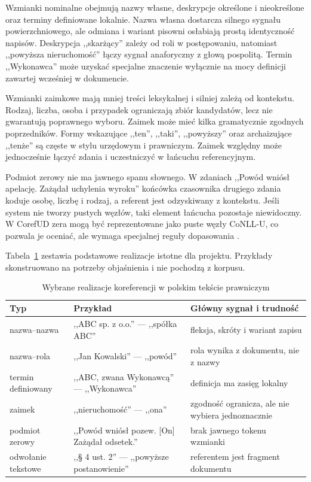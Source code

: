 Wzmianki nominalne obejmują nazwy własne, deskrypcje określone i nieokreślone oraz terminy definiowane lokalnie. Nazwa własna dostarcza silnego sygnału powierzchniowego, ale odmiana i wariant pisowni osłabiają prostą identyczność napisów. Deskrypcja ,,skarżący'' zależy od roli w postępowaniu, natomiast ,,powyższa nieruchomość'' łączy sygnał anaforyczny z głową pospolitą. Termin ,,Wykonawca'' może uzyskać specjalne znaczenie wyłącznie na mocy definicji zawartej wcześniej w dokumencie.

Wzmianki zaimkowe mają mniej treści leksykalnej i silniej zależą od kontekstu. Rodzaj, liczba, osoba i przypadek ograniczają zbiór kandydatów, lecz nie gwarantują poprawnego wyboru. Zaimek może mieć kilka gramatycznie zgodnych poprzedników. Formy wskazujące ,,ten'', ,,taki'', ,,powyższy'' oraz archaizujące ,,tenże'' są częste w stylu urzędowym i prawniczym. Zaimek względny może jednocześnie łączyć zdania i uczestniczyć w łańcuchu referencyjnym.

Podmiot zerowy nie ma jawnego spanu słownego. W zdaniach ,,Powód wniósł apelację. Zażądał uchylenia wyroku'' końcówka czasownika drugiego zdania koduje osobę, liczbę i rodzaj, a referent jest odzyskiwany z kontekstu. Jeśli system nie tworzy pustych węzłów, taki element łańcucha pozostaje niewidoczny. W CorefUD zera mogą być reprezentowane jako puste węzły CoNLL-U, co pozwala je oceniać, ale wymaga specjalnej reguły dopasowania \cite{nedoluzhko_2022_corefud}.

Tabela~\ref{tab:typy-coref} zestawia podstawowe realizacje istotne dla projektu. Przykłady skonstruowano na potrzeby objaśnienia i nie pochodzą z korpusu.

\begin{table}[htbp]
  \centering
  \caption{Wybrane realizacje koreferencji w polskim tekście prawniczym}
  \label{tab:typy-coref}
  \begin{tabular}{p{}p{}p{}}
    \toprule
    Typ & Przykład & Główny sygnał i trudność \\
    \midrule
    nazwa--nazwa & ,,ABC sp. z o.o.'' --- ,,spółka ABC'' & fleksja, skróty i wariant zapisu \\
    nazwa--rola & ,,Jan Kowalski'' --- ,,powód'' & rola wynika z dokumentu, nie z nazwy \\
    termin definiowany & ,,ABC, zwana Wykonawcą'' --- ,,Wykonawca'' & definicja ma zasięg lokalny \\
    zaimek & ,,nieruchomość'' --- ,,ona'' & zgodność ogranicza, ale nie wybiera jednoznacznie \\
    podmiot zerowy & ,,Powód wniósł pozew. [On] Zażądał odsetek.'' & brak jawnego tokenu wzmianki \\
    odwołanie tekstowe & ,,§ 4 ust. 2'' --- ,,powyższe postanowienie'' & referentem jest fragment dokumentu \\
    \bottomrule
  \end{tabular}
\end{table}

